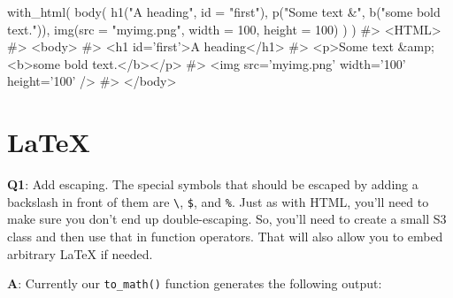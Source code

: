 \documentclass[
]{krantz}
\makeatletter
\newenvironment{Shaded}{\begin{snugshade}}{\end{snugshade}}
\newcommand{\CharTok}[1]{\textcolor[rgb]{0.31,0.60,0.02}{#1}}
\newcommand{\CommentTok}[1]{\textcolor[rgb]{0.56,0.35,0.01}{\textit{#1}}}
\newcommand{\DataTypeTok}[1]{\textcolor[rgb]{0.13,0.29,0.53}{#1}}
\newcommand{\DecValTok}[1]{\textcolor[rgb]{0.00,0.00,0.81}{#1}}
\newcommand{\KeywordTok}[1]{\textcolor[rgb]{0.13,0.29,0.53}{\textbf{#1}}}
\newcommand{\NormalTok}[1]{#1}
\newcommand{\OperatorTok}[1]{\textcolor[rgb]{0.81,0.36,0.00}{\textbf{#1}}}
\newcommand{\StringTok}[1]{\textcolor[rgb]{0.31,0.60,0.02}{#1}}
\newenvironment{kframe}{%
\medskip{}
\setlength{\fboxsep}{.8em}
 \def\at@end@of@kframe{}%
 \ifinner\ifhmode%
  \def\at@end@of@kframe{\end{minipage}}%
  \begin{minipage}{\columnwidth}%
 \fi\fi%
 \def\FrameCommand##1{\hskip\@totalleftmargin \hskip-\fboxsep
 \colorbox{shadecolor}{##1}\hskip-\fboxsep
     \hskip-\linewidth \hskip-\@totalleftmargin \hskip\columnwidth}%
 \MakeFramed {\advance\hsize-\width
   \@totalleftmargin\z@ \linewidth\hsize
   \@setminipage}}%
 {\par\unskip\endMakeFramed%
 \at@end@of@kframe}
\renewenvironment{Shaded}{\begin{kframe}}{\end{kframe}}
\renewcommand{\KeywordTok} [1]{\textcolor[rgb]{0.00,0.44,0.13}{{#1}}}
\renewcommand{\DataTypeTok}[1]{\textcolor[rgb]{0.56,0.13,0.00}{{#1}}}
\renewcommand{\DecValTok}  [1]{\textcolor[rgb]{0.25,0.63,0.44}{{#1}}}
\renewcommand{\CharTok}    [1]{\textcolor[rgb]{0.25,0.44,0.63}{{#1}}}
\renewcommand{\StringTok}  [1]{\textcolor[rgb]{0.25,0.44,0.63}{{#1}}}
\renewcommand{\CommentTok} [1]{\textcolor[rgb]{0.38,0.63,0.69}{{#1}}}
\renewcommand{\NormalTok}  [1]{{#1}}
\makeatother
\begin{document}
\begin{Shaded}
\begin{Highlighting}[]
\KeywordTok{with_html}\NormalTok{(}
  \KeywordTok{body}\NormalTok{(}
    \KeywordTok{h1}\NormalTok{(}\StringTok{"A heading"}\NormalTok{, }\DataTypeTok{id =} \StringTok{"first"}\NormalTok{),}
    \KeywordTok{p}\NormalTok{(}\StringTok{"Some text &"}\NormalTok{, }\KeywordTok{b}\NormalTok{(}\StringTok{"some bold text."}\NormalTok{)),}
    \KeywordTok{img}\NormalTok{(}\DataTypeTok{src =} \StringTok{"myimg.png"}\NormalTok{, }\DataTypeTok{width =} \DecValTok{100}\NormalTok{, }\DataTypeTok{height =} \DecValTok{100}\NormalTok{)}
\NormalTok{  )}
\NormalTok{)}
\CommentTok{#> <HTML>}
\CommentTok{#> <body>}
\CommentTok{#>   <h1 id='first'>A heading</h1>}
\CommentTok{#>   <p>Some text &amp;<b>some bold text.</b></p>}
\CommentTok{#>   <img src='myimg.png' width='100' height='100' />}
\CommentTok{#> </body>}
\end{Highlighting}
\end{Shaded}

\hypertarget{latex}{%
\section{LaTeX}\label{latex}}

\textbf{{Q1}}: Add escaping. The special symbols that should be escaped by adding a backslash in front of them are \texttt{\textbackslash{}}, \texttt{\$}, and \texttt{\%}. Just as with HTML, you'll need to make sure you don't end up double-escaping. So, you'll need to create a small S3 class and then use that in function operators. That will also allow you to embed arbitrary LaTeX if needed.

\textbf{{A}}: Currently our \texttt{to\_math()} function generates the following output:

\begin{Shaded}
\end{Shaded}
\end{document}
